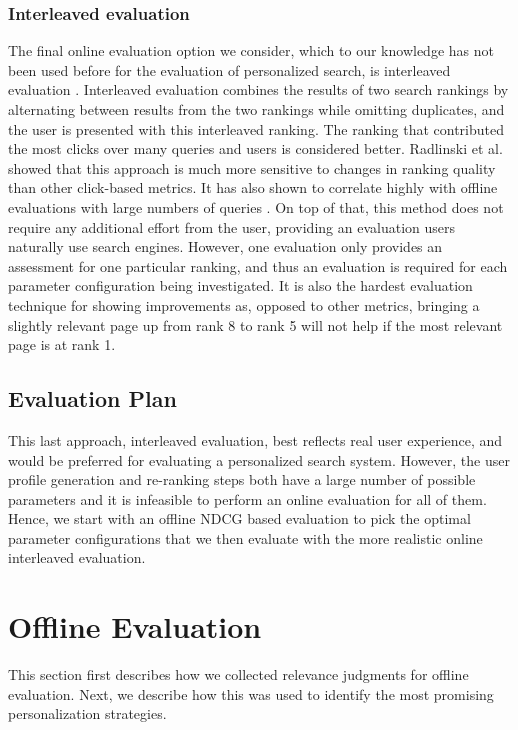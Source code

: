 \documentclass{sig-alternate}
\begin{document}
\subsubsection*{Interleaved evaluation}

The final online evaluation option we consider, which to our knowledge has not been used before for the evaluation of personalized search, is interleaved evaluation \cite{Joachims:Thorsten, Radlinski:Kurup}. Interleaved evaluation combines the results of two search rankings by alternating between results from the two rankings while omitting duplicates, and the user is presented with this interleaved ranking. The ranking that contributed the most clicks over many queries and users is considered better. Radlinski et al.~\cite{Radlinski:Kurup} showed that this approach is much more sensitive to changes in ranking quality than other click-based metrics. It has also shown to correlate highly with offline evaluations with large numbers of queries \cite{Radlinski:Craswell}. On top of that, this method does not require any additional effort from the user, providing an evaluation users naturally use search engines. However, one evaluation only provides an assessment for one particular ranking, and thus an evaluation is required for each parameter configuration being investigated. It is also the hardest evaluation technique for showing improvements as, opposed to other metrics, bringing a slightly relevant page up from rank 8 to rank 5 will not help if the most relevant page is at rank 1.

\subsection{Evaluation Plan}

This last approach, interleaved evaluation, best reflects real user experience, and would be preferred for evaluating a personalized search system. However, the user profile generation and re-ranking steps both have a large number of possible parameters and it is infeasible to perform an online evaluation for all of them. Hence, we start with an offline NDCG based evaluation to pick the optimal parameter configurations that we then evaluate with the more realistic online interleaved evaluation.

\section{Offline Evaluation}

This section first describes how we collected relevance judgments for offline evaluation. Next, we describe how this was used to identify the most promising personalization strategies.
\end{document}
